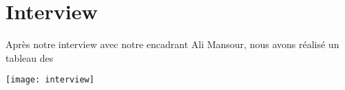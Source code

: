 \chapter{Interview}

Après notre interview avec notre encadrant Ali Mansour, nous avons réalisé un tableau des

\texttt{[image: interview]}

